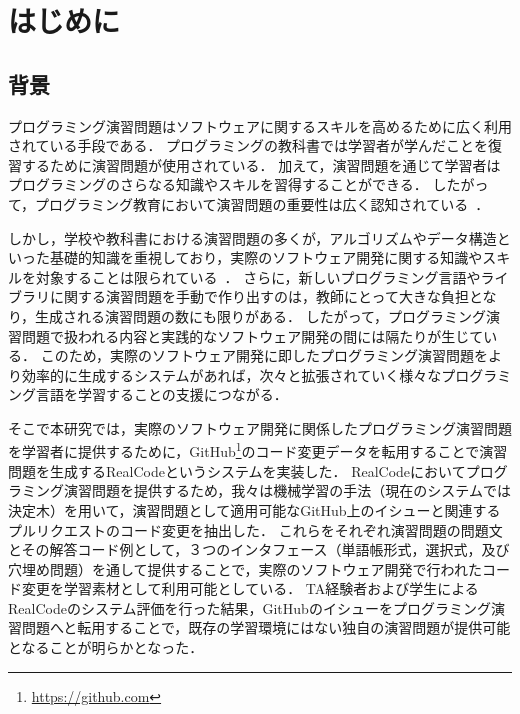 
\chapter{はじめに}  %

\graphicspath{{Chapter1/Figs/}}

\section{背景}
プログラミング演習問題はソフトウェアに関するスキルを高めるために広く利用されている手段である．
プログラミングの教科書では学習者が学んだことを復習するために演習問題が使用されている．
加えて，演習問題を通じて学習者はプログラミングのさらなる知識やスキルを習得することができる．
したがって，プログラミング教育において演習問題の重要性は広く認知されている~\cite{ericsson1993role,Winslow:1996:PPP:234867.234872}．


しかし，学校や教科書における演習問題の多くが，アルゴリズムやデータ構造といった基礎的知識を重視しており，実際のソフトウェア開発に関する知識やスキルを対象することは限られている~\cite{Allen:2003:PPC:611892.611940}．
さらに，新しいプログラミング言語やライブラリに関する演習問題を手動で作り出すのは，教師にとって大きな負担となり，生成される演習問題の数にも限りがある．
したがって，プログラミング演習問題で扱われる内容と実践的なソフトウェア開発の間には隔たりが生じている．
このため，実際のソフトウェア開発に即したプログラミング演習問題をより効率的に生成するシステムがあれば，次々と拡張されていく様々なプログラミング言語を学習することの支援につながる．

そこで本研究では，実際のソフトウェア開発に関係したプログラミング演習問題を学習者に提供するために，GitHub\footnote{\url{https://github.com}}のコード変更データを転用することで演習問題を生成するRealCodeというシステムを実装した．
RealCodeにおいてプログラミング演習問題を提供するため，我々は機械学習の手法（現在のシステムでは決定木）を用いて，演習問題として適用可能なGitHub上のイシューと関連するプルリクエストのコード変更を抽出した．
これらをそれぞれ演習問題の問題文とその解答コード例として，３つのインタフェース（単語帳形式，選択式，及び穴埋め問題）を通して提供することで，実際のソフトウェア開発で行われたコード変更を学習素材として利用可能としている．
TA経験者および学生によるRealCodeのシステム評価を行った結果，GitHubのイシューをプログラミング演習問題へと転用することで，既存の学習環境にはない独自の演習問題が提供可能となることが明らかとなった．


